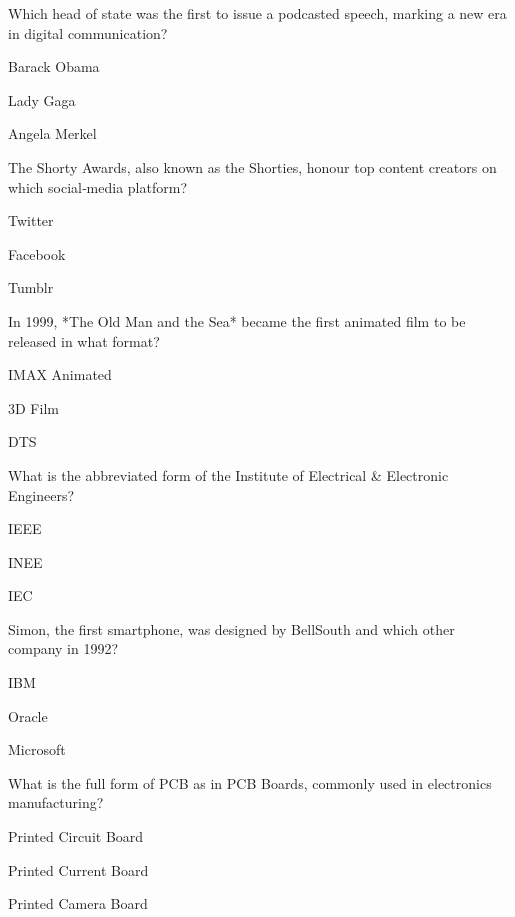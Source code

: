 \begin{enhancedmcq}{Which head of state was the first to issue a podcasted speech, marking a new era in digital communication?}
\item Barack Obama
\item Lady Gaga
\item Angela Merkel

\end{enhancedmcq}
\begin{enhancedmcq}{The Shorty Awards, also known as the Shorties, honour top content creators on which social‑media platform?}
\item Twitter
\item Facebook
\item Tumblr

\end{enhancedmcq}
\begin{enhancedmcq}{In 1999, *The Old Man and the Sea* became the first animated film to be released in what format?}
\item IMAX Animated
\item 3D Film
\item DTS

\end{enhancedmcq}
\begin{enhancedmcq}{What is the abbreviated form of the Institute of Electrical & Electronic Engineers?}
\item IEEE
\item INEE
\item IEC

\end{enhancedmcq}
\begin{enhancedmcq}{Simon, the first smartphone, was designed by BellSouth and which other company in 1992?}
\item IBM
\item Oracle
\item Microsoft

\end{enhancedmcq}
\begin{enhancedmcq}{What is the full form of PCB as in PCB Boards, commonly used in electronics manufacturing?}
\item Printed Circuit Board
\item Printed Current Board
\item Printed Camera Board

 
\end{enhancedmcq}